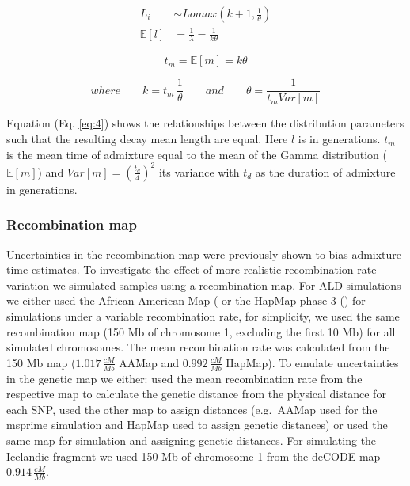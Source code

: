 \documentclass[]{article}
\begin{document}
\begin{equation}
\begin{split}
\label{eq:3}
L_i &\sim Lomax(k+1,\frac{1}{\theta}) \\
\mathbb{E}[l] &= \frac{1}{\lambda} = \frac{1}{k\theta}
\end{split}
\end{equation}

\begin{equation}
\label{eq:4}
t_{m}=\mathbb{E}[m] = k \theta
\end{equation}

\begin{equation*}
\nonumber
where \qquad k=t_m \, \frac{1}{\theta} \qquad and \qquad \theta=\frac{1}{t_{m}Var[m]}
\end{equation*}

Equation (Eq. \ref{eq:4}) shows the relationships between the
distribution parameters such that the resulting decay mean length are
equal. Here \(l\) is in generations. $t_{m}$ is the mean time of admixture equal to the mean of the Gamma distribution ($\mathbb{E}[m]$) and $Var[m]=(\frac{t_d}{4})^2$ its variance with $t_d$ as the duration of admixture in generations.

\subsubsection{Recombination map}\label{recombination map}

Uncertainties in the recombination map were previously shown to bias
admixture time estimates. To investigate the effect of more realistic
recombination rate variation we simulated samples using a recombination map. For ALD simulations we
either used the African-American-Map (\cite{hinch_landscape_2011} or
the HapMap phase 3 (\cite{HapMapConsortium_second_2007}) for simulations
under a variable recombination rate, for simplicity, we used the same
recombination map (150 Mb of chromosome 1, excluding the first 10 Mb)
for all simulated chromosomes. The mean recombination rate was
calculated from the 150 Mb map (\(1.017 \, \frac{cM}{Mb}\) AAMap and
\(0.992 \, \frac{cM}{Mb}\) HapMap). To emulate uncertainties in the
genetic map we either: used the mean recombination rate from the
respective map to calculate the genetic distance from the physical
distance for each SNP, used the other map to assign distances
(e.g.~AAMap used for the msprime simulation and HapMap used to assign
genetic distances) or used the same map for simulation and assigning
genetic distances. For simulating the Icelandic fragment we used 150 Mb of chromosome 1 from the deCODE map \cite{kong_fine-scale_2010} \(0.914 \, \frac{cM}{Mb}\).
\end{document}
